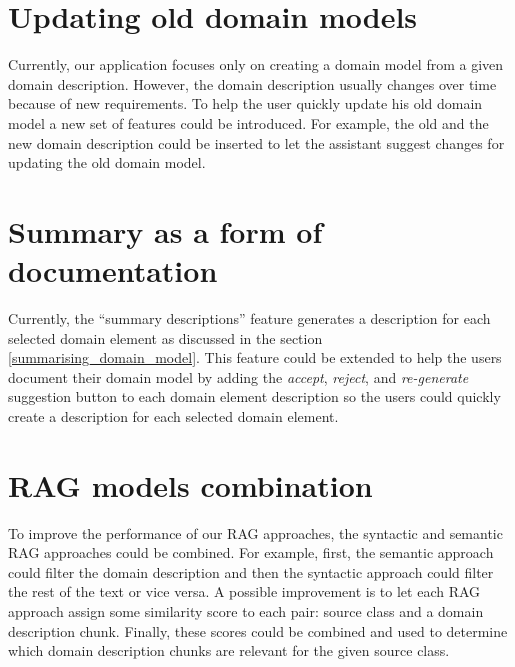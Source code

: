 \section{Updating old domain models}

Currently, our application focuses only on creating a domain model from a given domain description. However, the domain description usually changes over time because of new requirements. To help the user quickly update his old domain model a new set of features could be introduced. For example, the old and the new domain description could be inserted to let the assistant suggest changes for updating the old domain model.


\section{Summary as a form of documentation}

Currently, the ``summary descriptions'' feature generates a description for each selected domain element as discussed in the section \ref{summarising_domain_model}. This feature could be extended to help the users document their domain model by adding the \textit{accept}, \textit{reject}, and \textit{re-generate} suggestion button to each domain element description so the users could quickly create a description for each selected domain element.


\section{RAG models combination}

To improve the performance of our RAG approaches, the syntactic and semantic RAG approaches could be combined. For example, first, the semantic approach could filter the domain description and then the syntactic approach could filter the rest of the text or vice versa. A possible improvement is to let each RAG approach assign some similarity score to each pair: source class and a domain description chunk. Finally, these scores could be combined and used to determine which domain description chunks are relevant for the given source class.
